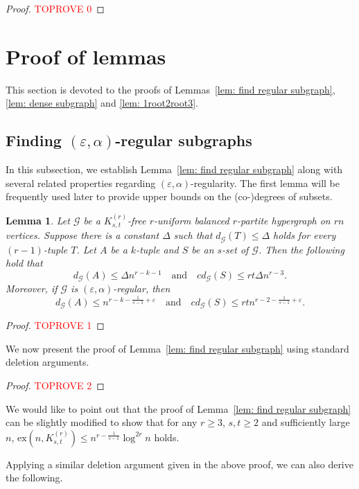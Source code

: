 \documentclass[11pt]{article}
\newtheorem{lem}[dfn]{Lemma}
\def\ex{\mathrm{ex}}
\begin{document}
\begin{proof}\textcolor{red}{TOPROVE 0}\end{proof}


\section{Proof of lemmas}
This section is devoted to the proofs of Lemmas~\ref{lem: find regular subgraph},  \ref{lem: dense subgraph} and \ref{lem: 1root2root3}.

\subsection{Finding $(\varepsilon,\alpha)$-regular subgraphs}
In this subsection, we establish Lemma~\ref{lem: find regular subgraph} along with several related properties regarding $(\varepsilon,\alpha)$-regularity.
The first lemma will be frequently used later to provide upper bounds on the (co-)degrees of subsets.

\begin{lem}\label{lem: set degree}
Let $\mathcal G$ be a $K_{s,t}^{(r)}$-free $r$-uniform balanced $r$-partite hypergraph on $rn$ vertices.
Suppose there is a constant $\Delta$ such that $d_{\mathcal G}(T)\le \Delta$ holds for every $(r-1)$-tuple $T$.
Let $A$ be a $k$-tuple and $S$ be an $s$-set of $\mathcal{G}$. Then the following hold that
$$ d_{\mathcal G}(A)\le  \Delta n^{r-k-1  }  \text{ ~ and ~ } cd_{\mathcal G}(S)\le rt\Delta n^{r-3}   .$$
Moreover, if $\mathcal G$ is $( \varepsilon,\alpha)$-regular, then
$$ d_{\mathcal G}(A)\le n^{r-k -\frac{1}{s-1}+  \varepsilon}  \text{ ~ and ~ }  cd_{\mathcal G}(S)\le  rtn^{r-2 -\frac{1}{s-1}+  \varepsilon  }  .$$
\end{lem}
\begin{proof}\textcolor{red}{TOPROVE 1}\end{proof}

We now present the proof of Lemma~\ref{lem: find regular subgraph} using standard deletion arguments.

\begin{proof}\textcolor{red}{TOPROVE 2}\end{proof}

We would like to point out that the proof of Lemma~\ref{lem: find regular subgraph} can be slightly modified to show that for any $r\geq 3$, $s,t\geq 2$ and sufficiently large $n$,
$\ex(n,K^{(r)}_{s,t})\leq n^{r-\frac{1}{s-1}}\log^{2r} n$ holds.

Applying a similar deletion argument given in the above proof, we can also derive the following.
\end{document}
